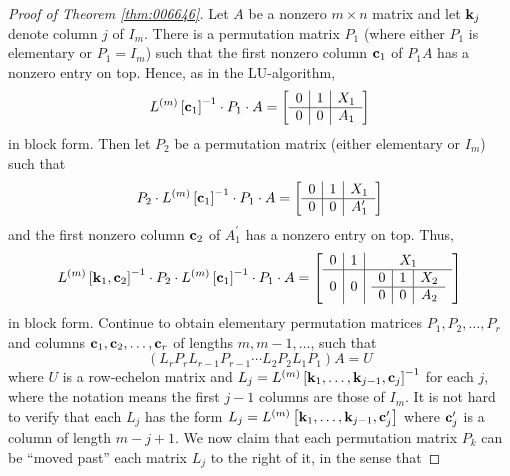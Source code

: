 \begin{proof}[Proof of Theorem \ref{thm:006646}]
Let $A$ be a nonzero $m \times n$ matrix and let $\textbf{k}_{j}$ denote column $j$ of $I_{m}$. There is a permutation matrix $P_{1}$ (where either $P_{1}$ is elementary or $P_{1} = I_{m}$) such that the first nonzero column $\textbf{c}_{1}$ of $P_{1}A$ has a nonzero entry on top. Hence, as in the LU-algorithm,
\begin{equation*}
L^{(m)} \left[ \textbf{c}_{1} \right]^{-1} \cdot P_{1} \cdot A = \left[ \begin{array}{c|c|c}
0 & 1 & X_{1} \\
\hline
0 & 0 & A_{1}
\end{array} \right]
\end{equation*}
in block form. Then let $P_{2}$ be a permutation matrix (either elementary or $I_{m}$) such that
\begin{equation*}
P_{2} \cdot L^{(m)} \left[ \textbf{c}_{1} \right]^{-1} \cdot P_{1} \cdot A = \left[ \begin{array}{c|c|c}
0 & 1 & X_{1} \\
\hline
0 & 0 & A_{1}^\prime
\end{array} \right]
\end{equation*}
and the first nonzero column $\textbf{c}_{2}$ of $A^\prime_{1}$ has a nonzero entry on top. Thus,
\begin{equation*}
L^{(m)} \left[ \textbf{k}_{1}, \textbf{c}_{2} \right]^{-1} \cdot P_{2} \cdot L^{(m)} \left[ \textbf{c}_{1} \right]^{-1} \cdot P_{1} \cdot A = \left[ \begin{array}{c|c|c}
0 & 1 & X_{1} \\
\hline
0 & 0 & \begin{array}{c|c|c}
0 & 1 & X_{2} \\
\hline
0 & 0 & A_{2}
\end{array}
\end{array} \right]
\end{equation*}
in block form. Continue to obtain elementary permutation matrices $P_{1}, P_{2}, \dots, P_{r}$ and columns $\textbf{c}_{1}, \textbf{c}_{2}, \dots, \textbf{c}_{r}$ of lengths $m, m - 1, \dots$, such that
\begin{equation*}
(L_{r}P_{r}L_{r-1}P_{r-1} \cdots L_{2}P_{2}L_{1}P_{1})A = U
\end{equation*}
where $U$ is a row-echelon matrix and $L_{j} = L^{(m)} \left[ \textbf{k}_{1}, \dots, \textbf{k}_{j-1}, \textbf{c}_{j} \right]^{-1}$ for each $j$, where the notation means the first $j - 1$ columns are those of $I_{m}$. It is not hard to verify that each $L_{j}$ has the form $L_{j} = L^{(m)} \left[ \textbf{k}_{1}, \dots, \textbf{k}_{j-1}, \textbf{c}^\prime_{j} \right]$ where $\textbf{c}^\prime_{j}$ is a column of length $m - j + 1$. We now claim that each permutation matrix $P_{k}$ can be ``moved past'' each matrix $L_{j}$ to the right of it, in the sense that

\end{proof}
